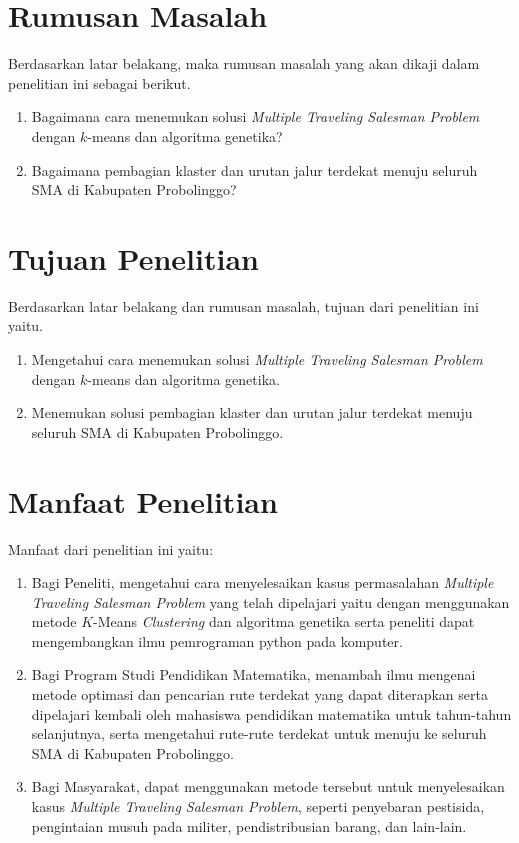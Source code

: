 \section{Rumusan Masalah}

Berdasarkan latar belakang, maka rumusan masalah yang akan dikaji dalam penelitian ini sebagai berikut.
\begin{enumerate}
    \item Bagaimana cara menemukan solusi \textit{Multiple Traveling Salesman Problem} dengan $k$-means dan algoritma genetika?
    \item Bagaimana pembagian klaster dan urutan jalur terdekat menuju seluruh SMA di Kabupaten Probolinggo?
\end{enumerate}

\section{Tujuan Penelitian}

Berdasarkan latar belakang dan rumusan masalah, tujuan dari penelitian ini yaitu.
\begin{enumerate}
	\item Mengetahui cara menemukan solusi \textit{Multiple Traveling Salesman Problem} dengan $k$-means dan algoritma genetika.
	\item Menemukan solusi pembagian klaster dan urutan jalur terdekat menuju seluruh SMA di Kabupaten Probolinggo.
\end{enumerate}

\section{Manfaat Penelitian}

Manfaat dari penelitian ini yaitu:
\begin{enumerate}
	\item Bagi Peneliti, mengetahui cara menyelesaikan kasus permasalahan \textit{Multiple Traveling Salesman Problem} yang telah dipelajari yaitu dengan menggunakan metode $K$-Means \textit{Clustering} dan algoritma genetika serta peneliti dapat mengembangkan ilmu pemrograman python pada komputer.

	\item Bagi Program Studi Pendidikan Matematika, menambah ilmu mengenai metode optimasi dan pencarian rute terdekat yang dapat diterapkan serta dipelajari kembali oleh mahasiswa pendidikan matematika untuk tahun-tahun selanjutnya, serta mengetahui rute-rute terdekat untuk menuju ke seluruh SMA di Kabupaten Probolinggo.
	
	\item Bagi Masyarakat, dapat menggunakan metode tersebut untuk menyelesaikan kasus \textit{Multiple Traveling Salesman Problem}, seperti penyebaran pestisida, pengintaian musuh pada militer, pendistribusian barang, dan lain-lain.
	
\end{enumerate}

